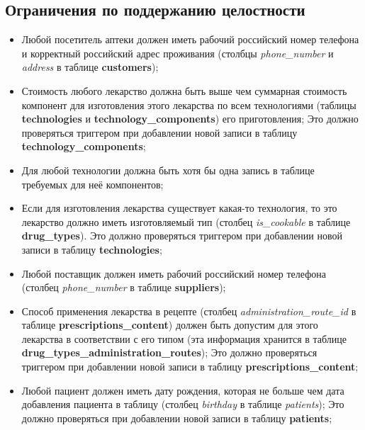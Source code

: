 \documentclass[a4paper]{article}
\newcommand{\dbtable}[1]{\textbf{#1}}
\newcommand{\dbtableref}[1]{\textit{#1}}
\begin{document}
		\subsection{Ограничения по поддержанию целостности}
			\begin{itemize}
				\item Любой посетитель аптеки должен иметь рабочий российский номер телефона и корректный российский адрес проживания (столбцы \dbtableref{phone\_number} и \dbtableref{address} в таблице \dbtable{customers}); 
				
				\item Стоимость любого лекарство должна быть выше чем суммарная стоимость компонент для изготовления этого лекарства по всем технологиями (таблицы \dbtable{technologies} и \dbtable{technology\_components}) его приготовления; Это должно проверяться триггером при добавлении новой записи в таблицу \dbtable{technology\_components};
				
				\item Для любой технологии должна быть хотя бы одна запись в таблице требуемых для неё компонентов;
				
				\item Если для изготовления лекарства существует какая-то технология, то это лекарство должно иметь изготовляемый тип (столбец \dbtableref{is\_cookable} в таблице \dbtable{drug\_types}). Это должно проверяться триггером при добавлении новой записи в таблицу \dbtable{technologies};
				
				\item Любой поставщик должен иметь рабочий российский номер телефона \newline (столбец \dbtableref{phone\_number} в таблице \dbtable{suppliers});
				
				\item Способ применения лекарства в рецепте (столбец \dbtableref{administration\_route\_id} в таблице \dbtable{prescriptions\_content}) должен быть допустим для этого лекарства в соответствии с его типом (эта информация хранится в таблице \dbtable{drug\_types\_administration\_routes}); Это должно проверяться триггером при добавлении новой записи в таблицу \newline \dbtable{prescriptions\_content};
				
				\item Любой пациент должен иметь дату рождения, которая не больше чем дата добавления пациента в таблицу (столбец \dbtableref{birthday} в таблице \dbtableref{patients}); Это должно проверяться при добавлении новой записи в таблицу \dbtable{patients};
				

\end{itemize}
\end{document}
